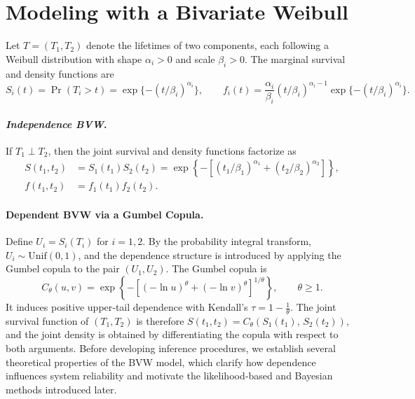 \documentclass[twoside]{article}
\theoremstyle{plain}
\theoremstyle{definition}
\begin{document}
\section{Modeling with a Bivariate Weibull}
Let $T=(T_1,T_2)$ denote the lifetimes of two components, each following a Weibull distribution with shape $\alpha_i>0$ and scale $\beta_i>0$. The marginal survival and density functions are
\begin{equation}
S_i(t)=\Pr(T_i>t)=\exp\{-(t/\beta_i)^{\alpha_i}\},
\qquad
f_i(t)=\frac{\alpha_i}{\beta_i}(t/\beta_i)^{\alpha_i-1}
       \exp\{-(t/\beta_i)^{\alpha_i}\}.
\end{equation}

\paragraph{\textit{Independence BVW}.}
If $T_1 \perp T_2$, then the joint survival and density functions factorize as
\begin{align}
S(t_1,t_2) &= S_1(t_1)S_2(t_2)
= \exp\!\left\{-\left[(t_1/\beta_1)^{\alpha_1}
                     + (t_2/\beta_2)^{\alpha_2}\right]\right\},\\
f(t_1,t_2) &= f_1(t_1)f_2(t_2).
\end{align}

\paragraph{Dependent BVW via a Gumbel Copula.}
Define $U_i = S_i(T_i)$ for $i=1,2$. 
By the probability integral transform, $U_i \sim \mathrm{Unif}(0,1)$, 
and the dependence structure is introduced by applying the Gumbel copula 
to the pair $(U_1, U_2)$.  
The Gumbel copula \citep{Nelsen2006} is
\begin{equation}
C_\theta(u,v)
= \exp\left\{-\left[(-\ln u)^\theta + (-\ln v)^\theta\right]^{1/\theta}\right\},
\qquad \theta \ge 1.
\end{equation}
It induces positive upper‑tail dependence with Kendall’s
$  
\tau = 1 - \frac{1}{\theta}.
$  
The joint survival function of $(T_1,T_2)$ is therefore
$  
S(t_1,t_2) = C_\theta\!\left(S_1(t_1),\, S_2(t_2)\right),
$  
and the joint density is obtained by differentiating the copula with respect to both arguments.
Before developing inference procedures, we establish several theoretical properties of the BVW model, which clarify how dependence influences system reliability and motivate the likelihood‑based and Bayesian methods introduced later.
\end{document}
